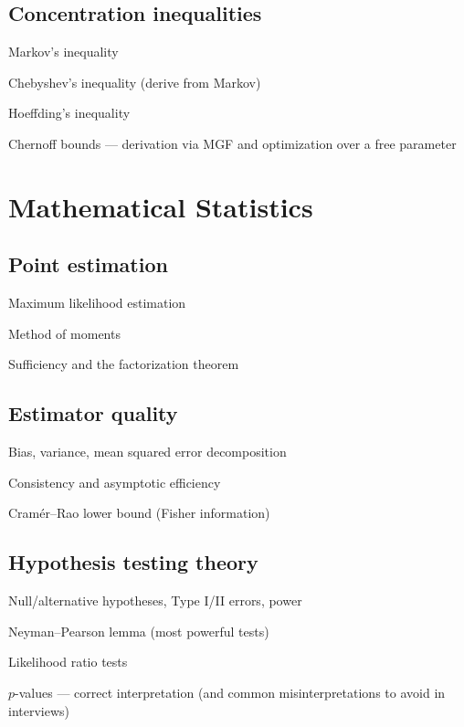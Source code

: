 \subsection{Concentration inequalities}
\begin{tasklist}
    \item Markov's inequality
    \item Chebyshev's inequality (derive from Markov)
    \item Hoeffding's inequality
    \item Chernoff bounds — derivation via MGF and optimization over a free parameter
\end{tasklist}

\section{Mathematical Statistics}

\subsection{Point estimation}
\begin{tasklist}
    \item Maximum likelihood estimation \review {}
    \item Method of moments
    \item Sufficiency and the factorization theorem
\end{tasklist}

\subsection{Estimator quality}
\begin{tasklist}
    \item Bias, variance, mean squared error decomposition \review
    \item Consistency and asymptotic efficiency
    \item Cramér--Rao lower bound (Fisher information)
\end{tasklist}

\subsection{Hypothesis testing theory}
\begin{tasklist}
    \item Null/alternative hypotheses, Type I/II errors, power \review
    \item Neyman--Pearson lemma (most powerful tests)
    \item Likelihood ratio tests
    \item $p$-values — correct interpretation (and common misinterpretations to avoid in interviews)
\end{tasklist}

